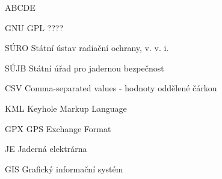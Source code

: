 
\begin{seznamzkratek}{ABCDE}

	      {GNU GPL}
	      {????}

	      {SÚRO}
	      {Státní ústav radiační ochrany, v. v. i.}

	      {SÚJB}
	      {Státní úřad pro jadernou bezpečnost}

		  {CSV}
		  {Comma-separated values - hodnoty oddělené čárkou}
		  
		  {KML}
		  {Keyhole Markup Language}
		  
		  {GPX}
		  {GPS Exchange Format}
	
		  {JE}
		  {Jaderná elektrárna}
		  
		  {GIS}
		  {Grafický informační systém}
\end{seznamzkratek}